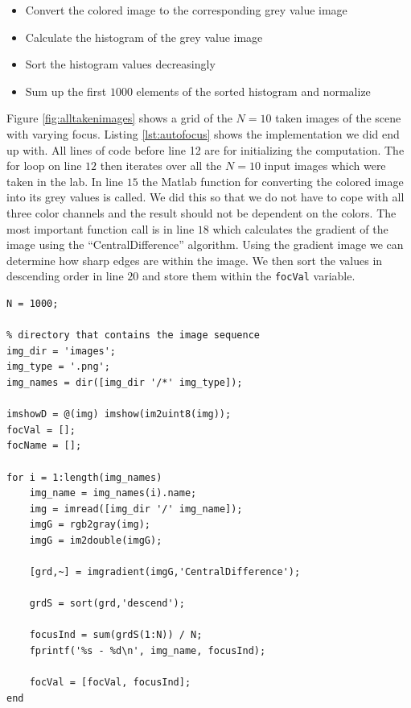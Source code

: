 \documentclass[
a4paper,     %
11pt         %
]{scrartcl}  %
\begin{document}
\begin{itemize}
 \item Convert the colored image to the corresponding grey value image
 \item Calculate the histogram of the grey value image
 \item Sort the histogram values decreasingly
 \item Sum up the first $1000$ elements of the sorted histogram and normalize
\end{itemize}

Figure \ref{fig:alltakenimages} shows a grid of the $N=10$ taken images of the scene with varying focus.
Listing \ref{lst:autofocus} shows the implementation we did end up with.
All lines of code before line 12 are for initializing the computation.
The for loop on line $12$ then iterates over all the $N=10$ input images which were taken in the lab.
In line $15$ the Matlab function for converting the colored image into its grey values is called.
We did this so that we do not have to cope with all three color channels and the result should not be dependent on the colors.
The most important function call is in line $18$ which calculates the gradient of the image using the ``CentralDifference'' algorithm.
Using the gradient image we can determine how sharp edges are within the image.
We then sort the values in descending order in line $20$ and store them within the \lstinline{focVal} variable.

\begin{lstlisting}[label=lst:autofocus, caption=Matlab script for calculating best focus value]
N = 1000;

% directory that contains the image sequence
img_dir = 'images';
img_type = '.png';
img_names = dir([img_dir '/*' img_type]);

imshowD = @(img) imshow(im2uint8(img));
focVal = [];
focName = [];

for i = 1:length(img_names)
    img_name = img_names(i).name;
    img = imread([img_dir '/' img_name]);
    imgG = rgb2gray(img);
    imgG = im2double(imgG);
    
    [grd,~] = imgradient(imgG,'CentralDifference');
    
    grdS = sort(grd,'descend');
    
    focusInd = sum(grdS(1:N)) / N;
    fprintf('%s - %d\n', img_name, focusInd);
    
    focVal = [focVal, focusInd];
end
\end{lstlisting}
\end{document}
